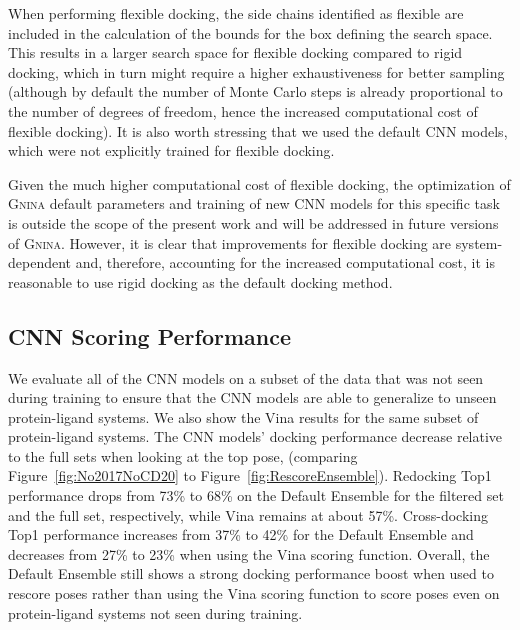 \documentclass[linenumbers,doublespacing]{bmcart}
\begin{document}
When performing flexible docking, the side chains identified as flexible are included in the calculation of the bounds for the box defining the search space. This results in a larger search space for flexible docking compared to rigid docking, which in turn might require a higher exhaustiveness for better sampling (although by default the number of Monte Carlo steps is already proportional to the number of degrees of freedom, hence the increased computational cost of flexible docking). It is also worth stressing that we used the default CNN models, which were not explicitly trained for flexible docking. 

Given the much higher computational cost of flexible docking, the optimization of \textsc{Gnina} default parameters and training of new CNN models for this specific task is outside the scope of the present work and will be addressed in  future versions of \textsc{Gnina}. However, it is clear that improvements for flexible docking are system-dependent and, therefore, accounting for the increased computational cost, it is reasonable to use rigid docking as the default docking method.

\subsection{CNN Scoring Performance}
We evaluate all of the CNN models on a subset of the data that was not seen  during training to ensure that the CNN models are able to generalize to unseen protein-ligand systems. We also show the Vina results for the same subset of protein-ligand systems. The CNN models' docking performance decrease relative to the full sets when looking at the top pose, (comparing Figure~\ref{fig:No2017NoCD20} to Figure~\ref{fig:RescoreEnsemble}). Redocking Top1 performance drops from 73\% to 68\% on the Default Ensemble for the filtered set and the full set, respectively, while Vina remains at about 57\%. Cross-docking Top1 performance increases from 37\% to 42\% for the Default Ensemble and decreases from 27\% to 23\% when using the Vina scoring function. Overall, the Default Ensemble still shows a strong docking performance boost when used to rescore poses rather than using the Vina scoring function to score poses even on protein-ligand systems not seen during training.
\end{document}

